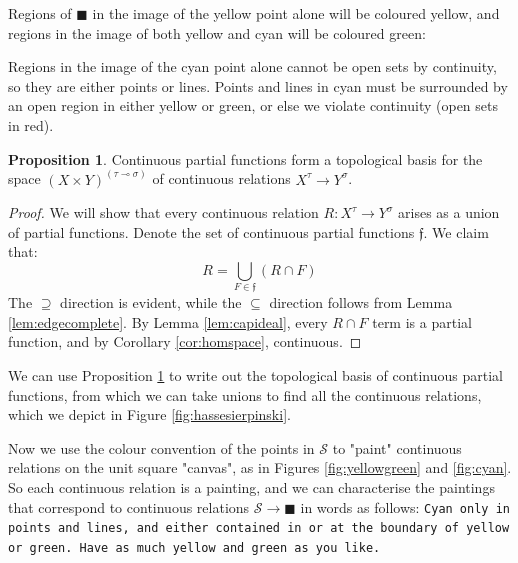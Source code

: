 \documentclass{tufte-handout}
\theoremstyle{definition}
\newtheorem{proposition}[theorem]{Proposition}
\begin{document}
\begin{marginfigure}
\centering
{}
\caption{Regions of $\blacksquare$ in the image of the yellow point alone will be coloured yellow, and regions in the image of both yellow and cyan will be coloured green:}
\label{fig:yellowgreen}
\end{marginfigure}

\begin{marginfigure}
\centering
{}
\caption{Regions in the image of the cyan point alone cannot be open sets by continuity, so they are either points or lines. Points and lines in cyan must be surrounded by an open region in either yellow or green, or else we violate continuity (open sets in red).}
\label{fig:cyan}
\end{marginfigure}

\begin{proposition}\label{prop:hombasis}
Continuous partial functions form a topological basis for the space $(X \times Y)^{(\tau \multimap \sigma)}$ of continuous relations $X^\tau \rightarrow Y^\sigma$.
\begin{proof}
We will show that every continuous relation $R: X^\tau \rightarrow Y^\sigma$ arises as a union of partial functions. Denote the set of continuous partial functions $\mathfrak{f}$. We claim that:
\[ R = \bigcup\limits_{F \in \mathfrak{f}} (R \cap F) \]
The $\supseteq$ direction is evident, while the $\subseteq$ direction follows from Lemma \ref{lem:edgecomplete}.
By Lemma \ref{lem:capideal}, every $R \cap F$ term is a partial function, and by Corollary \ref{cor:homspace}, continuous.
\end{proof}
\end{proposition}

 We can use Proposition \ref{prop:hombasis} to write out the topological basis of continuous partial functions, from which we can take unions to find all the continuous relations, which we depict in Figure \ref{fig:hassesierpinski}.

Now we use the colour convention of the points in $\mathcal{S}$ to "paint" continuous relations on the unit square "canvas", as in Figures \ref{fig:yellowgreen} and \ref{fig:cyan}. So each continuous relation is a painting, and we can characterise the paintings that correspond to continuous relations $\mathcal{S} \rightarrow \blacksquare$ in words as follows: \texttt{Cyan only in points and lines, and either contained in or at the boundary of yellow or green. Have as much yellow and green as you like.}
\end{document}
